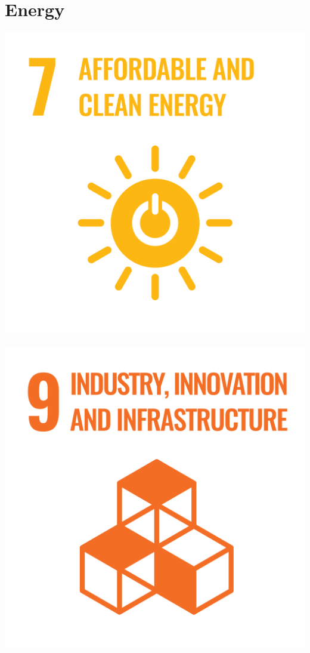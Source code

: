 \documentclass[../SustainableHEP.tex]{subfiles}
\begin{document}
\RaggedRight
\sloppy

\newpage
\section{Energy}
\label{sec:Energy}
\exSum


\begin{center}
\includegraphics[width=\SDGsize]{Sections/Figs/Common/SDG_7_CleanEnergy.png}~%
\includegraphics[width=\SDGsize]{Sections/Figs/Common/SDG_9_IndustryInnovation.png}~%

\end{center}
\end{document}
